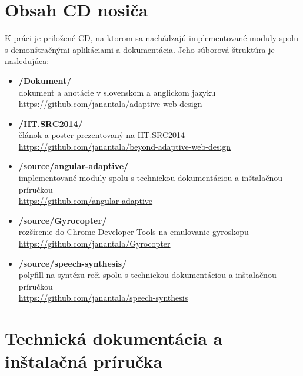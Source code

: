 
\section{Obsah CD nosiča} %
\label{sec:obsah_cd_nosi_a}
K práci je priložené CD, na ktorom sa nachádzajú implementované moduly spolu s demonštračnými aplikáciami a dokumentácia. Jeho súborová štruktúra je nasledujúca:

\begin{itemize}
  \item \textbf{/Dokument/}\\
    dokument a anotácie v slovenskom a anglickom jazyku\\
    \url{https://github.com/janantala/adaptive-web-design}

  \item \textbf{/IIT.SRC2014/}\\
    článok a poster prezentovaný na IIT.SRC2014\\
    \url{https://github.com/janantala/beyond-adaptive-web-design}

  \item \textbf{/source/angular-adaptive/}\\
    implementované moduly spolu s technickou dokumentáciou a inštalačnou príručkou\\
    \url{https://github.com/angular-adaptive}

  \item \textbf{/source/Gyrocopter/}\\
    rozšírenie do Chrome Developer Tools na emulovanie gyroskopu\\
    \url{https://github.com/janantala/Gyrocopter}

  \item \textbf{/source/speech-synthesis/}\\
    polyfill na syntézu reči spolu s technickou dokumentáciou a inštalačnou príručkou\\
    \url{https://github.com/janantala/speech-synthesis}

\end{itemize}



\newpage
\section{Technická dokumentácia a inštalačná príručka} %
\label{sec:technick_dokument_cia_a_in_tala_n_pr_ru_ka}

